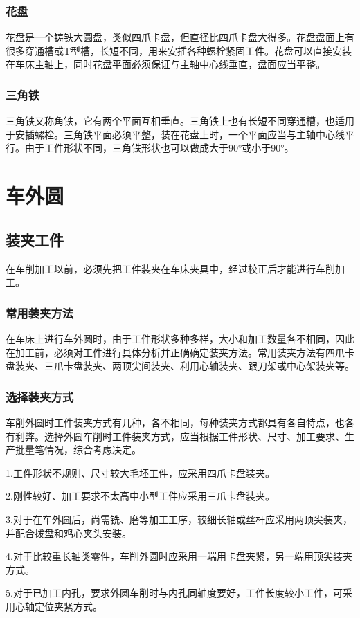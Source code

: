 \documentclass{ctexbook}
\begin{document}
\subsubsection{花盘}
花盘是一个铸铁大圆盘，类似四爪卡盘，但直径比四爪卡盘大得多。花盘盘面上有很多穿通槽或T型槽，长短不同，用来安插各种螺栓紧固工件。花盘可以直接安装在车床主轴上，同时花盘平面必须保证与主轴中心线垂直，盘面应当平整。
\subsubsection{三角铁}
三角铁又称角铁，它有两个平面互相垂直。三角铁上也有长短不同穿通槽，也适用于安插螺栓。三角铁平面必须平整，装在花盘上时，一个平面应当与主轴中心线平行。由于工件形状不同，三角铁形状也可以做成大于90°或小于90°。
\section{车外圆}
\subsection{装夹工件}
在车削加工以前，必须先把工件装夹在车床夹具中，经过校正后才能进行车削加工。
\subsubsection{常用装夹方法}
在车床上进行车外圆时，由于工件形状多种多样，大小和加工数量各不相同，因此在加工前，必须对工件进行具体分析并正确确定装夹方法。常用装夹方法有四爪卡盘装夹、三爪卡盘装夹、两顶尖间装夹、利用心轴装夹、跟刀架或中心架装夹等。
\subsubsection{选择装夹方式}
车削外圆时工件装夹方式有几种，各不相同，每种装夹方式都具有各自特点，也各有利弊。选择外圆车削时工件装夹方式，应当根据工件形状、尺寸、加工要求、生产批量笔情况，综合考虑决定。

1.工件形状不规则、尺寸较大毛坯工件，应采用四爪卡盘装夹。

2.刚性较好、加工要求不太高中小型工件应采用三爪卡盘装夹。

3.对于在车外圆后，尚需铣、磨等加工工序，较细长轴或丝杆应采用两顶尖装夹，并配合拨盘和鸡心夹头安装。

4.对于比较重长轴类零件，车削外圆时应采用一端用卡盘夹紧，另一端用顶尖装夹方式。

5.对于已加工内孔，要求外圆车削时与内孔同轴度要好，工件长度较小工件，可采用心轴定位夹紧方式。
\end{document}
